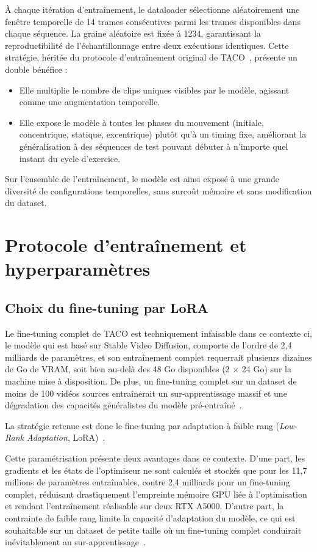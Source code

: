 À chaque itération d'entraînement, le dataloader sélectionne aléatoirement une fenêtre temporelle de 14 trames consécutives parmi les trames disponibles dans chaque séquence. La graine aléatoire est fixée à 1234, garantissant la reproductibilité de l'échantillonnage entre deux exécutions identiques. Cette stratégie, héritée du protocole d'entraînement original de TACO~\cite{TACO-2025}, présente un double bénéfice :

\begin{itemize}
  \item Elle multiplie le nombre de clips uniques visibles par le modèle, agissant comme une augmentation temporelle.
  \item Elle expose le modèle à toutes les phases du mouvement (initiale, concentrique, statique, excentrique) plutôt qu'à un timing fixe, améliorant la généralisation à des séquences de test pouvant débuter à n'importe quel instant du cycle d'exercice.
\end{itemize}

Sur l'ensemble de l'entraînement, le modèle est ainsi exposé à une grande diversité de configurations temporelles, sans surcoût mémoire et sans modification du dataset.

\section{Protocole d'entraînement et hyperparamètres}
\label{sec:protocole}

\subsection{Choix du fine-tuning par LoRA}

Le fine-tuning complet de TACO est techniquement infaisable dans ce contexte ci, le modèle qui est basé sur Stable Video Diffusion, comporte de l'ordre de 2,4 milliards de paramètres, et son entraînement complet requerrait plusieurs dizaines de Go de VRAM, soit bien au-delà des 48 Go disponibles (2 $\times$ 24 Go) sur la machine mise à disposition. De plus, un fine-tuning complet sur un dataset de moins de 100 vidéos sources entraînerait un sur-apprentissage massif et une dégradation des capacités généralistes du modèle pré-entraîné~\cite{LoRA-2021}.

La stratégie retenue est donc le fine-tuning par adaptation à faible rang (\emph{Low-Rank Adaptation}, LoRA)~\cite{LoRA-2021}. 

Cette paramétrisation présente deux avantages dans ce contexte. D'une part, les gradients et les états de l'optimiseur ne sont calculés et stockés que pour les 11,7 millions de paramètres entraînables, contre 2,4 milliards pour un fine-tuning complet, réduisant drastiquement l'empreinte mémoire GPU liée à l'optimisation et rendant l'entraînement réalisable sur deux RTX A5000. D'autre part, la contrainte de faible rang limite la capacité d'adaptation du modèle, ce qui est souhaitable sur un dataset de petite taille où un fine-tuning complet conduirait inévitablement au sur-apprentissage~\cite{LoRA-2021}.

